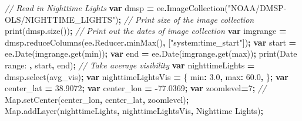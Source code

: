 \documentclass[
]{article}
\newenvironment{Shaded}{\begin{snugshade}}{\end{snugshade}}
\newcommand{\AttributeTok}[1]{\textcolor[rgb]{0.77,0.63,0.00}{#1}}
\newcommand{\BuiltInTok}[1]{#1}
\newcommand{\CommentTok}[1]{\textcolor[rgb]{0.56,0.35,0.01}{\textit{#1}}}
\newcommand{\DataTypeTok}[1]{\textcolor[rgb]{0.13,0.29,0.53}{#1}}
\newcommand{\DecValTok}[1]{\textcolor[rgb]{0.00,0.00,0.81}{#1}}
\newcommand{\FloatTok}[1]{\textcolor[rgb]{0.00,0.00,0.81}{#1}}
\newcommand{\FunctionTok}[1]{\textcolor[rgb]{0.00,0.00,0.00}{#1}}
\newcommand{\KeywordTok}[1]{\textcolor[rgb]{0.13,0.29,0.53}{\textbf{#1}}}
\newcommand{\NormalTok}[1]{#1}
\newcommand{\OperatorTok}[1]{\textcolor[rgb]{0.81,0.36,0.00}{\textbf{#1}}}
\newcommand{\StringTok}[1]{\textcolor[rgb]{0.31,0.60,0.02}{#1}}
\begin{document}
\begin{Shaded}
\begin{Highlighting}[]
\CommentTok{// Read in Nighttime Lights}
\KeywordTok{var}\NormalTok{ dmsp }\OperatorTok{=}\NormalTok{ ee}\OperatorTok{.}\FunctionTok{ImageCollection}\NormalTok{(}\StringTok{"NOAA/DMSP{-}OLS/NIGHTTIME\_LIGHTS"}\NormalTok{)}\OperatorTok{;}
\CommentTok{// Print size of the image collection}
\FunctionTok{print}\NormalTok{(dmsp}\OperatorTok{.}\FunctionTok{size}\NormalTok{())}\OperatorTok{;}
\CommentTok{// Print out the dates of image collection}
\KeywordTok{var}\NormalTok{ imgrange }\OperatorTok{=}\NormalTok{ dmsp}\OperatorTok{.}\FunctionTok{reduceColumns}\NormalTok{(ee}\OperatorTok{.}\AttributeTok{Reducer}\OperatorTok{.}\FunctionTok{minMax}\NormalTok{()}\OperatorTok{,}\NormalTok{ [}\StringTok{"system:time\_start"}\NormalTok{])}\OperatorTok{;}
\KeywordTok{var}\NormalTok{ start }\OperatorTok{=}\NormalTok{ ee}\OperatorTok{.}\FunctionTok{Date}\NormalTok{(imgrange}\OperatorTok{.}\FunctionTok{get}\NormalTok{(}\StringTok{\textquotesingle{}min\textquotesingle{}}\NormalTok{))}\OperatorTok{;}
\KeywordTok{var}\NormalTok{ end }\OperatorTok{=}\NormalTok{ ee}\OperatorTok{.}\FunctionTok{Date}\NormalTok{(imgrange}\OperatorTok{.}\FunctionTok{get}\NormalTok{(}\StringTok{\textquotesingle{}max\textquotesingle{}}\NormalTok{))}\OperatorTok{;}
\FunctionTok{print}\NormalTok{(}\StringTok{\textquotesingle{}Date range: \textquotesingle{}}\OperatorTok{,}\NormalTok{ start}\OperatorTok{,}\NormalTok{ end)}\OperatorTok{;}
\CommentTok{// Take average visibility }
\KeywordTok{var}\NormalTok{ nighttimeLights }\OperatorTok{=}\NormalTok{ dmsp}\OperatorTok{.}\FunctionTok{select}\NormalTok{(}\StringTok{\textquotesingle{}avg\_vis\textquotesingle{}}\NormalTok{)}\OperatorTok{;}
\KeywordTok{var}\NormalTok{ nighttimeLightsVis }\OperatorTok{=}\NormalTok{ \{}
  \DataTypeTok{min}\OperatorTok{:} \FloatTok{3.0}\OperatorTok{,}
  \DataTypeTok{max}\OperatorTok{:} \FloatTok{60.0}\OperatorTok{,}
\NormalTok{\}}\OperatorTok{;}
\KeywordTok{var}\NormalTok{ center\_lat }\OperatorTok{=} \FloatTok{38.9072}\OperatorTok{;}
\KeywordTok{var}\NormalTok{ center\_lon }\OperatorTok{=} \OperatorTok{{-}}\FloatTok{77.0369}\OperatorTok{;}
\KeywordTok{var}\NormalTok{ zoomlevel}\OperatorTok{=}\DecValTok{7}\OperatorTok{;}
\CommentTok{// }
\BuiltInTok{Map}\OperatorTok{.}\FunctionTok{setCenter}\NormalTok{(center\_lon}\OperatorTok{,}\NormalTok{ center\_lat}\OperatorTok{,}\NormalTok{ zoomlevel)}\OperatorTok{;}
\BuiltInTok{Map}\OperatorTok{.}\FunctionTok{addLayer}\NormalTok{(nighttimeLights}\OperatorTok{,}\NormalTok{ nighttimeLightsVis}\OperatorTok{,} \StringTok{\textquotesingle{}Nighttime Lights\textquotesingle{}}\NormalTok{)}\OperatorTok{;}
\end{Highlighting}
\end{Shaded}
\end{document}
